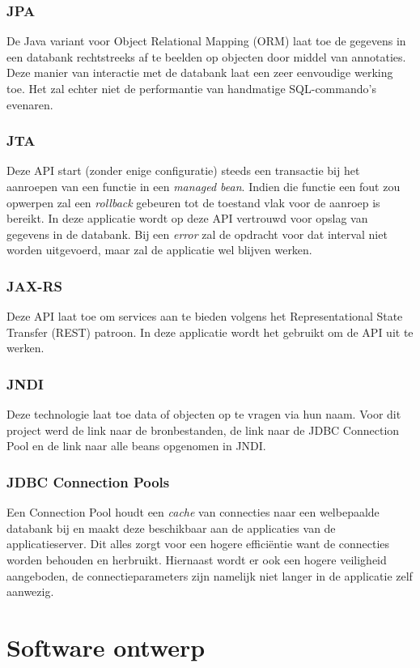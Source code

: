 \documentclass[ps,a4paper,oneside]{report}
\begin{document}
\subsubsection{JPA}
De Java variant voor Object Relational Mapping (ORM) laat toe de gegevens in een databank rechtstreeks af te beelden op objecten door middel van annotaties. Deze manier van interactie met de databank laat een zeer eenvoudige werking toe. Het zal echter niet de performantie van handmatige SQL-commando's evenaren.
\subsubsection{JTA}
Deze API start (zonder enige configuratie) steeds een transactie bij het aanroepen van een functie in een \textit{managed bean}. Indien die functie een fout zou opwerpen zal een \textit{rollback} gebeuren tot de toestand vlak voor de aanroep is bereikt. In deze applicatie wordt op deze API vertrouwd voor opslag van gegevens in de databank.  Bij een \textit{error} zal de opdracht voor dat interval niet worden uitgevoerd, maar zal de applicatie wel blijven werken.
\subsubsection{JAX-RS}
Deze API laat toe om services aan te bieden volgens het Representational State Transfer (REST) patroon. In deze applicatie wordt het gebruikt om de API uit te werken.
\subsubsection{JNDI}
Deze technologie laat toe data of objecten op te vragen via hun naam. Voor dit project werd de link naar de bronbestanden, de link naar de JDBC Connection Pool en de link naar alle beans opgenomen in JNDI.
\subsubsection{JDBC Connection Pools}
Een Connection Pool houdt een \textit{cache} van connecties naar een welbepaalde databank bij en maakt deze beschikbaar aan de applicaties van de applicatieserver. Dit alles zorgt voor een hogere effici\"entie want de connecties worden behouden en herbruikt. Hiernaast wordt er ook een hogere veiligheid aangeboden, de connectieparameters zijn namelijk niet langer in de applicatie zelf aanwezig.
\section{Software ontwerp}
\end{document}
